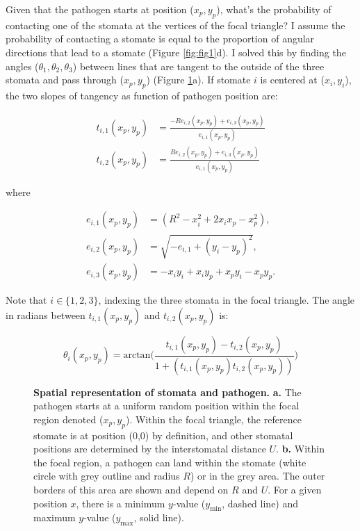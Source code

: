 \documentclass[utf8]{frontiersSCNS}
\begin{document}
Given that the pathogen starts at position (\(x_p,y_p\)), what's the
probability of contacting one of the stomata at the vertices of the
focal triangle? I assume the probability of contacting a stomate is
equal to the proportion of angular directions that lead to a stomate
(Figure \ref{fig:fig1}d). I solved this by finding the angles
(\(\theta_1, \theta_2, \theta_3\)) between lines that are tangent to the
outside of the three stomata and pass through (\(x_p,y_p\)) (Figure
\ref{fig:fig2}a). If stomate \(i\) is centered at (\(x_i,y_i\)), the two
slopes of tangency as function of pathogen position are:

\begin{align}
  t_{i,1}(x_p,y_p) & = \frac{-R e_{i,2}(x_p,y_p) + e_{i,3}(x_p,y_p)}{e_{i,1}(x_p,y_p)} \\
  t_{i,2}(x_p,y_p) & = \frac{R e_{i,2}(x_p,y_p) + e_{i,3}(x_p,y_p)}{e_{i,1}(x_p,y_p)}
\end{align}

where

\begin{align}
  e_{i,1}(x_p,y_p) & = (R^2 - x_i^2 + 2 x_i x_p - x_p^2), \\
  e_{i,2}(x_p,y_p) & = \sqrt{-e_{i,1} + (y_i - y_p) ^ 2}, \\
  e_{i,3}(x_p,y_p) & = - x_i y_i + x_i y_p + x_p y_i - x_p y_p.
\end{align}

Note that \(i \in \{1, 2, 3\}\), indexing the three stomata in the focal
triangle. The angle in radians between \(t_{i,1}(x_p,y_p)\) and
\(t_{i,2}(x_p,y_p)\) is:

\begin{equation}
  \theta_i(x_p,y_p) = \text{arctan}\bigg(\frac{t_{i,1}(x_p,y_p) - t_{i,2}(x_p,y_p)}{1 + (t_{i,1}(x_p,y_p) t_{i,2}(x_p,y_p))}\bigg)
\end{equation}

\begin{figure}
\centering

\caption{\textbf{Spatial representation of stomata and pathogen.} \textbf{a.} The pathogen starts at a uniform random position within the focal region denoted ($x_p,y_p$). Within the focal triangle, the reference stomate is at position (0,0) by definition, and other stomatal positions are determined by the interstomatal distance $U$. \textbf{b.} Within the focal region, a pathogen can land within the stomate (white circle with grey outline and radius $R$) or in the grey area. The outer borders of this area are shown and depend on $R$ and $U$. For a given position $x$, there is a minimum $y$-value ($y_\text{min}$, dashed line) and maximum $y$-value ($y_\text{max}$, solid line).}
\label{fig:fig2}
\end{figure}
\end{document}
